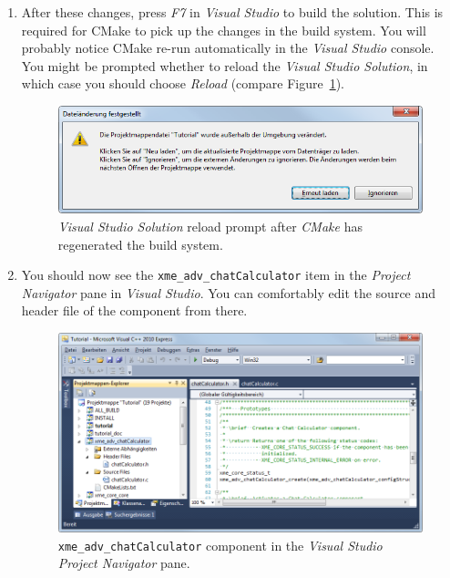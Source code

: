 \begin{enumerate}
	\item After these changes, press \emph{F7} in \emph{Visual Studio} to build the solution.
		This is required for CMake to pick up the changes in the build system.
		You will probably notice CMake re-run automatically in the \emph{Visual Studio} console.
		You might be prompted whether to reload the \emph{Visual Studio Solution}, in which case you should choose \emph{Reload}
		(compare Figure~\ref{fig:vs_detect_change_tutorial}).

\begin{figure}[htpb]
	\centering
	\includegraphics[scale=0.75]{figures/PNG/vs_detect_change_tutorial.png}
	\caption{\emph{Visual Studio Solution} reload prompt after \emph{CMake} has regenerated the build system.}
	\label{fig:vs_detect_change_tutorial}
\end{figure}

	\item You should now see the \verb|xme_adv_chatCalculator| item in the \emph{Project Navigator} pane in \emph{Visual Studio}.
		You can comfortably edit the source and header file of the component from there.

\begin{figure}[htpb]
	\centering
	\includegraphics[width=\textwidth]{figures/PNG/vs_chatCalculator.png}
	\caption{\texttt{xme\_adv\_chatCalculator} component in the \emph{Visual Studio Project Navigator} pane.}
	\label{fig:vs_chatCalculator}
\end{figure}


\end{enumerate}
